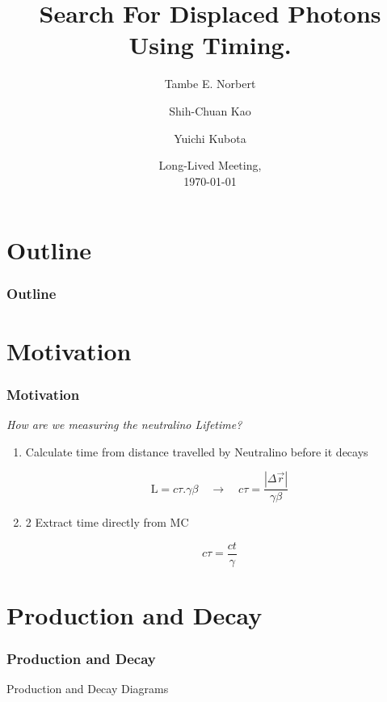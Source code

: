 \documentclass{beamer}
\title{Search For Displaced Photons Using Timing.}
\author[Tambe E. Norbert] %
{Tambe E. Norbert\inst{1} \and Shih-Chuan Kao\inst{1} \and Yuichi Kubota\inst{1}}
\institute[UMN]{
\inst{1}%
University Of Minnesota
}
\date{ Long-Lived Meeting,\\ \today}
\begin{document}
\begin{frame}
\titlepage
\begin{center}
\href{mailto:norbe072@umn.edu}{}
\end{center}
\end{frame}
\section*{Outline}
\begin{frame}
\frametitle{\Huge Outline}
\tableofcontents
\end{frame}
\section{Motivation}
\begin{frame}
\frametitle{\Huge Motivation}
\begin{LARGE}
\textit{How are we measuring the neutralino Lifetime?}
\end{LARGE}
\begin{enumerate}
\item Calculate time from distance travelled by Neutralino before it decays
\begin{Definition}
\begin{displaymath}
\mathrm{L} = c\tau.\gamma \beta \quad \rightarrow \quad c\tau = \frac{|\Delta\overrightarrow{r}|}{\gamma \beta}
\end{displaymath}
\end{Definition}
\item 2 Extract time directly from MC
\begin{Definition}[MC Time]
\begin{displaymath}
c\tau = \frac{ct}{\gamma}
\end{displaymath}
\end{Definition}
\end{enumerate}
\end{frame}
\section{Production and Decay}
\begin{frame}
\frametitle{\Huge Production and Decay}
Production and Decay Diagrams
\end{frame}
\end{document}

